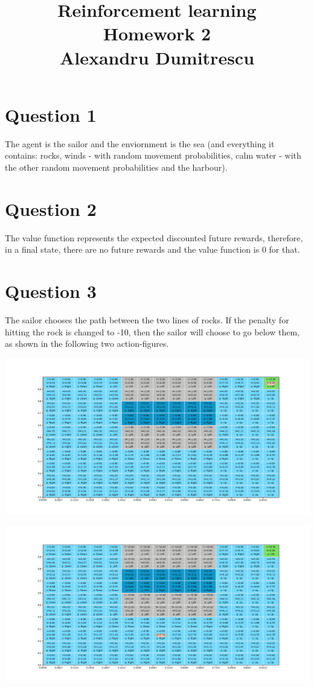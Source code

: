 \documentclass{article}
\title{Reinforcement learning\\ Homework 2\\ Alexandru Dumitrescu}
\date{}
\begin{document}
\maketitle
\section{Question 1}
The agent is the sailor and the enviornment is the sea (and everything it contains: rocks, winds - with random movement probabilities, calm water - with the other random movement probabilities and the harbour).

\section{Question 2}
The value function represents the expected discounted future rewards, therefore, in a final state, there are no future rewards and the value function is 0 for that.


\section{Question 3}
The sailor chooses the path between the two lines of rocks. If the penalty for hitting the rock is changed to -10, then the sailor will choose to go below them, as shown in the following two action-figures.\\

\centerline{\includegraphics[scale=0.39]{Sailor_win.png}} 

\centerline{\includegraphics[scale=0.39]{below1.png}} 
\end{document}
